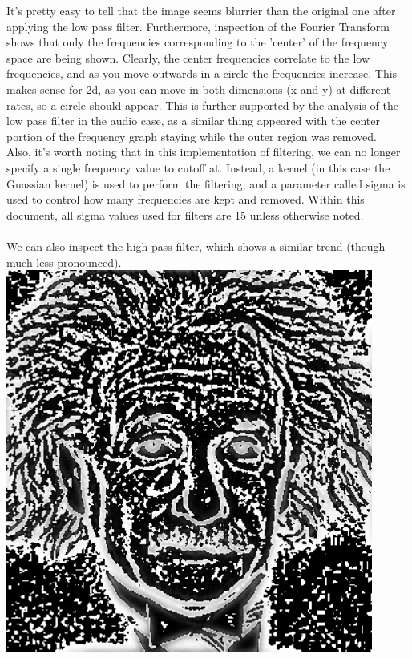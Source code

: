 \documentclass[notitlepage]{article}
\begin{document}
It's pretty easy to tell that the image seems blurrier than the original one after
applying the low pass filter. Furthermore, inspection of the Fourier Transform
shows that only the frequencies corresponding to the 'center' of the frequency space
are being shown. Clearly, the center frequencies correlate to the low frequencies, and
as you move outwards in a circle the frequencies increase. This makes sense for 2d, as you
can move in both dimensions (x and y) at different rates, so a circle should appear. This is
further supported by the analysis of the low pass filter in the audio case, as a similar thing
appeared with the center portion of the frequency graph staying while the outer region was removed.
\\
Also, it's worth noting that in this implementation of filtering, we can no longer specify a single
frequency value to cutoff at. Instead, a kernel (in this case the Guassian kernel) is used to perform
the filtering, and a parameter called sigma is used to control how many frequencies are kept and removed.
Within this document, all sigma values used for filters are 15 unless otherwise noted.
\\\\
We can also inspect the high pass filter, which shows a similar trend (though much less pronounced).
\\
\includegraphics[width=4.75in]{../samples/images/einstein_high15.png}
\end{document}
